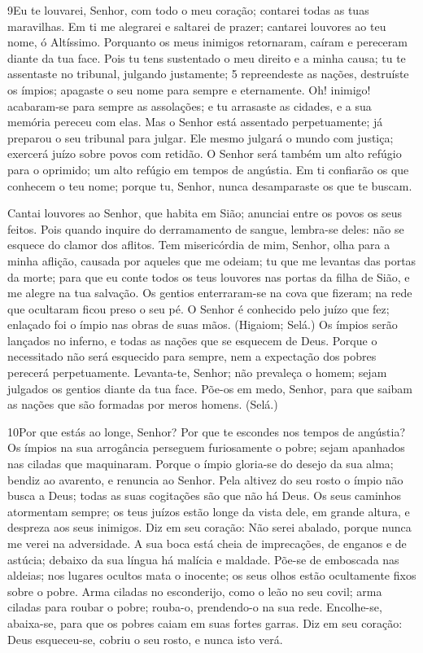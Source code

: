 \bigskip

\lettrine{9}{}Eu te louvarei, Senhor, com todo o meu coração;
contarei todas as tuas maravilhas. Em ti me alegrarei e saltarei
de prazer; cantarei louvores ao teu nome, ó Altíssimo. Porquanto
os meus inimigos retornaram, caíram e pereceram diante da tua face.
Pois tu tens sustentado o meu direito e a minha causa; tu te
assentaste no tribunal, julgando justamente; 5 repreendeste as
nações, destruíste os ímpios; apagaste o seu nome para sempre e
eternamente. Oh! inimigo! acabaram-se para sempre as assolações;
e tu arrasaste as cidades, e a sua memória pereceu com elas. Mas
o Senhor está assentado perpetuamente; já preparou o seu tribunal
para julgar. Ele mesmo julgará o mundo com justiça; exercerá
juízo sobre povos com retidão. O Senhor será também um alto
refúgio para o oprimido; um alto refúgio em tempos de angústia.
Em ti confiarão os que conhecem o teu nome; porque tu,
Senhor, nunca desamparaste os que te buscam.

Cantai louvores ao Senhor, que habita em Sião; anunciai entre os
povos os seus feitos. Pois quando inquire do derramamento de
sangue, lembra-se deles: não se esquece do clamor dos aflitos.
Tem misericórdia de mim, Senhor, olha para a minha aflição,
causada por aqueles que me odeiam; tu que me levantas das portas da
morte; para que eu conte todos os teus louvores nas portas da
filha de Sião, e me alegre na tua salvação. Os gentios
enterraram-se na cova que fizeram; na rede que ocultaram ficou preso
o seu pé. O Senhor é conhecido pelo juízo que fez; enlaçado
foi o ímpio nas obras de suas mãos. (Higaiom; Selá.) Os
ímpios serão lançados no inferno, e todas as nações que se esquecem
de Deus. Porque o necessitado não será esquecido para sempre,
nem a expectação dos pobres perecerá perpetuamente.
Levanta-te, Senhor; não prevaleça o homem; sejam julgados os
gentios diante da tua face. Põe-os em medo, Senhor, para que
saibam as nações que são formadas por meros homens. (Selá.)

\bigskip

\lettrine{10}{}Por que estás ao longe, Senhor? Por que te
escondes nos tempos de angústia? Os ímpios na sua arrogância
perseguem furiosamente o pobre; sejam apanhados nas ciladas que
maquinaram. Porque o ímpio gloria-se do desejo da sua alma;
bendiz ao avarento, e renuncia ao Senhor. Pela altivez do seu
rosto o ímpio não busca a Deus; todas as suas cogitações são que não
há Deus. Os seus caminhos atormentam sempre; os teus juízos
estão longe da vista dele, em grande altura, e despreza aos seus
inimigos. Diz em seu coração: Não serei abalado, porque nunca me
verei na adversidade. A sua boca está cheia de imprecações, de
enganos e de astúcia; debaixo da sua língua há malícia e maldade.
Põe-se de emboscada nas aldeias; nos lugares ocultos mata o
inocente; os seus olhos estão ocultamente fixos sobre o pobre.
Arma ciladas no esconderijo, como o leão no seu covil; arma
ciladas para roubar o pobre; rouba-o, prendendo-o na sua rede.
Encolhe-se, abaixa-se, para que os pobres caiam em suas
fortes garras. Diz em seu coração: Deus esqueceu-se, cobriu o
seu rosto, e nunca isto verá.

